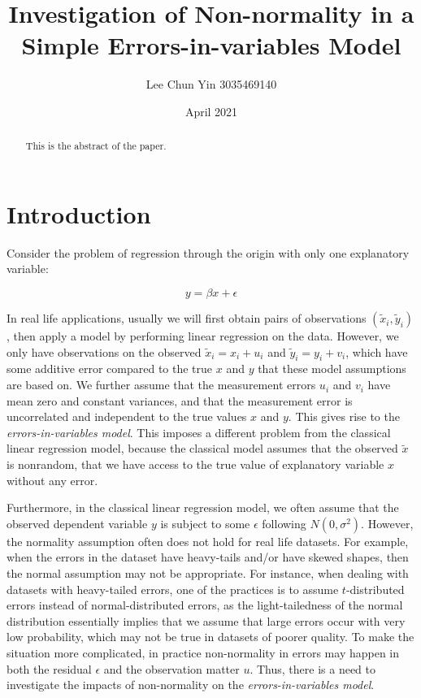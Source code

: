 \documentclass{article}
\title{Investigation of Non-normality in a Simple Errors-in-variables Model}
\author{Lee Chun Yin 3035469140}
\date{April 2021}
\begin{document}
\maketitle

\begin{abstract}
    This is the abstract of the paper.
\end{abstract}

\section{Introduction}

Consider the problem of regression through the origin with only one explanatory variable:

\[
y = \beta x + \epsilon
\]

In real life applications, usually we will first obtain pairs of observations $(\tilde{x}_i, \tilde{y}_i)$, then apply a model by performing linear regression on the data.
However, we only have observations on the observed $\tilde{x}_i = x_i + u_i$ and $\tilde{y}_i = y_i + v_i$, which have some additive error compared to the true $x$ and $y$ that these model assumptions are based on.
We further assume that the measurement errors $u_i$ and $v_i$ have mean zero and constant variances, and that the measurement error is uncorrelated and independent to the true values $x$ and $y$.
This gives rise to the \textit{errors-in-variables model}.
This imposes a different problem from the classical linear regression model, because the classical model assumes that the observed $\tilde{x}$ is nonrandom, that we have access to the true value of explanatory variable $x$ without any error. 

Furthermore, in the classical linear regression model, we often assume that the observed dependent variable $y$ is subject to some $\epsilon$ following $N(0, \sigma^2)$.
However, the normality assumption often does not hold for real life datasets.
For example, when the errors in the dataset have heavy-tails and/or have skewed shapes, then the normal assumption may not be appropriate.
For instance, when dealing with datasets with heavy-tailed errors, one of the practices is to assume $t$-distributed errors instead of normal-distributed errors,
as the light-tailedness of the normal distribution essentially implies that we assume that large errors occur with very low probability, which may not be true in datasets of poorer quality.
To make the situation more complicated, in practice non-normality in errors may happen in both the residual $\epsilon$ and the observation matter $u$.
Thus, there is a need to investigate the impacts of non-normality on the \textit{errors-in-variables model}. 
\end{document}
